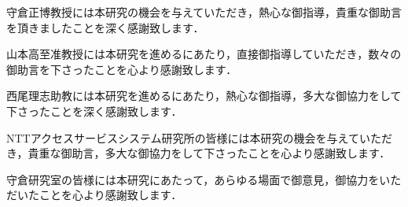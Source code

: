 \documentclass[master]{kuisthesis}		%
\begin{document}
\acknowledgments				%
守倉正博教授には本研究の機会を与えていただき，熱心な御指導，貴重な御助言を頂きましたことを深く感謝致します．

山本高至准教授には本研究を進めるにあたり，直接御指導していただき，数々の御助言を下さったことを心より感謝致します．

西尾理志助教には本研究を進めるにあたり，熱心な御指導，多大な御協力をして下さったことを深く感謝致します．

NTTアクセスサービスシステム研究所の皆様には本研究の機会を与えていただき，貴重な御助言，多大な御協力をして下さったことを心より感謝致します．

守倉研究室の皆様には本研究にあたって，あらゆる場面で御意見，御協力をいただいたことを心より感謝致します．

\nocite{*}
\end{document}
